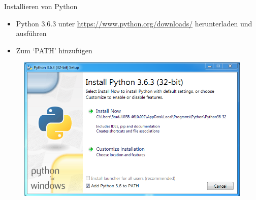 \begin{frame}{Installieren von Python}
    \begin{itemize}
        \item Python 3.6.3 unter \url{https://www.python.org/downloads/} herunterladen 
        und ausführen
        \item Zum `PATH' hinzufügen 
    \end{itemize}
    \begin{figure}
        \includegraphics[scale=0.4]{images/python_install} 
    \end{figure}
\end{frame}

